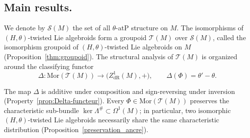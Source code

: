 \documentclass[11pt,a4paper]{article}
\theoremstyle{plain}
\theoremstyle{definition}
\theoremstyle{remark}
\begin{document}
\subsection{Main results.}
We denote by  $\mathcal{S}(M)$ the set of all $\theta$-atP structure on $M$. 
The isomorphisms of $(H,\theta)$-twisted Lie algebroids form a groupoid  $\mathcal{T}(M)$  over $\mathcal{S}(M)$, called the isomorphism groupoid of $(H,\theta)$-twisted Lie algebroids on $M$ (Proposition~\ref{thm:groupoid}).
 The structural
analysis of $\mathcal{T}(M)$ is organized around the classifying functor
$$
\Delta:\mathrm{Mor}\!\left(\mathcal{T}(M)\right)
\longrightarrow\bigl(Z^{1}_{\mathrm{dR}}(M),+\bigr),
\qquad \Delta(\Phi)=\theta'-\theta.
$$

The map $\Delta$ is additive under composition and sign-reversing under inversion
(Property~\ref{prop:Delta-functeur}).  Every $\Phi\in\mathrm{Mor}\!\left(\mathcal{T}(M)\right)$
preserves the characteristic sub-bundle $\ker\Lambda^{\#}\subset\Omega^{1}(M)$;
in particular, two isomorphic $(H,\theta)$-twisted Lie algebroids necessarily share the
same characteristic distribution (Proposition~\ref{preservation_ancre}).
\end{document}
